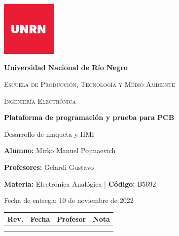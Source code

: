 \documentclass[12pt,letterpaper]{article}     %
\begin{document}

\begin{titlepage}
\centering
{\includegraphics[width=0.2\textwidth]{imagenes/LOGOUNRN.jpg}\par}
\vspace{0.5cm}
{\bfseries\large Universidad Nacional de Río Negro \par}
\vspace{0.5cm}
{\scshape\large Escuela de Producción, Tecnología y Medio Ambiente \par}
\vspace{0.5cm}
{\scshape\large Ingeniería Electrónica \par}
\vspace{3cm}
{\bfseries\Large Plataforma de programación y prueba para PCB \par}
{\Large Desarrollo de maqueta y HMI\par}
\vfill
{\large \textbf{Alumno:} Mirko Manuel Pojmaevich\par}
{\large \textbf{Profesores:} Gelardi Gustavo\par}
{\large \textbf{Materia:} Electrónica Analógica | \textbf{Código:} B5692\par}
\vspace{3cm}
{\large Fecha de entrega: 10 de noviembre de 2022 \par}
\vspace{1cm}
\begin{table}[!ht]
\begin{center}
\begin{tabular}{| c | c | c | c |}
\hline
\textbf{Rev.} & \textbf{Fecha} & \textbf{Profesor} & \textbf{Nota} \\ 
\hline
 &  & & \\
 \hline
 & & &  \\
\hline
\end{tabular}
\end{center}
\end{table}
\end{titlepage}
\newpage
\tableofcontents
\newpage
\listoffigures
\end{document}
